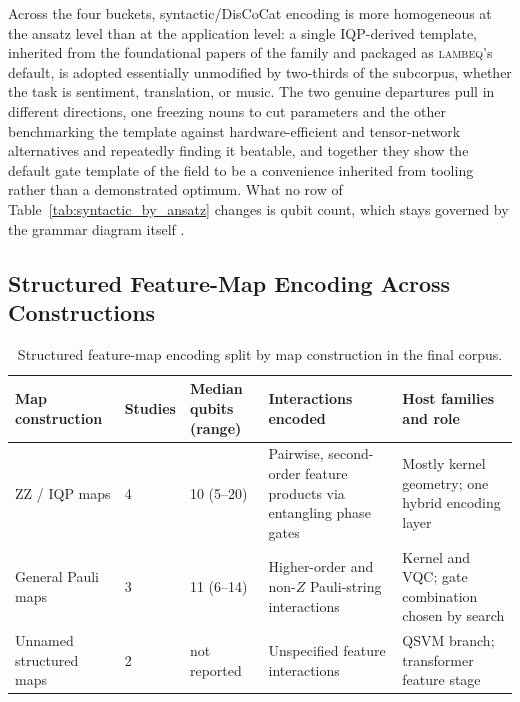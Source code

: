 \documentclass{ieeeaccess}
\begin{document}
Across the four buckets, syntactic/DisCoCat encoding is more homogeneous at the ansatz level than at the application level: a single IQP-derived template, inherited from the foundational papers of the family and packaged as \textsc{lambeq}'s default, is adopted essentially unmodified by two-thirds of the subcorpus, whether the task is sentiment, translation, or music. The two genuine departures pull in different directions, one freezing nouns to cut parameters and the other benchmarking the template against hardware-efficient and tensor-network alternatives and repeatedly finding it beatable, and together they show the default gate template of the field to be a convenience inherited from tooling rather than a demonstrated optimum. What no row of Table~\ref{tab:syntactic_by_ansatz} changes is qubit count, which stays governed by the grammar diagram itself \cite{sreedhar_towards_2025,uotila_sql2circuits_2025}.

\subsection{Structured Feature-Map Encoding Across Constructions}
\label{subsec:structured_across_constructions}

\begin{table}[t]
\caption{Structured feature-map encoding split by map construction in the final corpus.}
\label{tab:structured_by_construction}
\centering
\scriptsize
\begin{tabular}{@{}p{} p{} p{} p{} p{}@{}}
\hline
\textbf{Map construction} & \textbf{Studies} & \textbf{Median qubits (range)} & \textbf{Interactions encoded} & \textbf{Host families and role} \\
\hline
ZZ / IQP maps & 4 & 10 (5--20) & Pairwise, second-order feature products via entangling phase gates & Mostly kernel geometry; one hybrid encoding layer \\
General Pauli maps & 3 & 11 (6--14) & Higher-order and non-$Z$ Pauli-string interactions & Kernel and VQC; gate combination chosen by search \\
Unnamed structured maps & 2 & not reported & Unspecified feature interactions & QSVM branch; transformer feature stage \\
\hline
\end{tabular}
\end{table}
\end{document}
